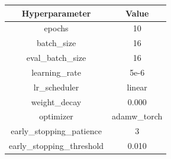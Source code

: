 \begin{tabular}{|c||c|}
\toprule
Hyperparameter & Value \\ \midrule
\midrule
epochs & 10 \\ \midrule
batch\_size & 16 \\ \midrule
eval\_batch\_size & 16 \\ \midrule
learning\_rate & 5e-6 \\ \midrule
lr\_scheduler & linear \\ \midrule
weight\_decay & 0.000 \\ \midrule
optimizer & adamw\_torch \\ \midrule
early\_stopping\_patience & 3 \\ \midrule
early\_stopping\_threshold & 0.010 \\ \midrule
\bottomrule
\end{tabular}
